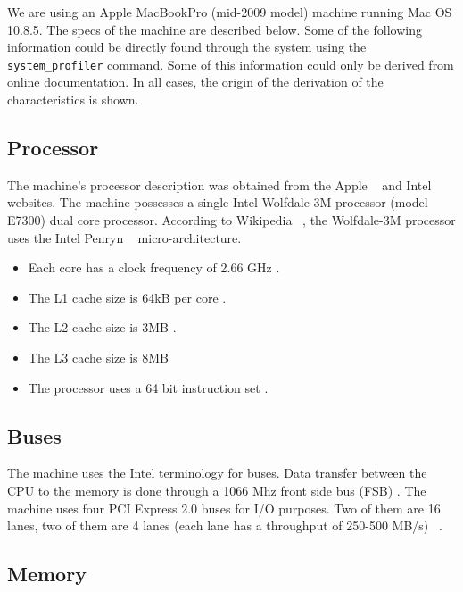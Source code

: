 We are using an Apple MacBookPro (mid-2009 model) machine running Mac OS 10.8.5. The specs of the machine are described below. Some of the following information could be directly found through the system using the \texttt{system\_profiler} command. Some of this information could only be derived from online documentation. In all cases, the origin of the derivation of the characteristics is shown.

\subsection{Processor}
The machine's processor description was obtained from the Apple ~\cite{appleProc} and Intel ~\cite{intelProc} websites. 
The machine possesses a single Intel Wolfdale-3M processor (model E7300) dual core processor. According to Wikipedia ~\cite{WikiWolfdale}, the Wolfdale-3M processor uses the Intel Penryn ~\cite{WikiPenryn} micro-architecture. 

\begin{itemize}
\item{Each core has a clock frequency of 2.66 GHz .}
\item{The L1 cache size is 64kB per core .}
\item{The L2 cache size is 3MB .}
\item{The L3 cache size is 8MB }
\item{The processor uses a 64 bit instruction set .}
\end{itemize}

\subsection{Buses}

The machine uses the Intel terminology for buses. Data transfer between the CPU to the memory is done through a 1066 Mhz  front side bus (FSB) . The machine uses four PCI Express 2.0 buses for I/O purposes. Two of them are 16 lanes, two of them are 4 lanes (each lane has a throughput of 250-500 MB/s) ~\cite{AppleBus}.

\subsection{Memory}

